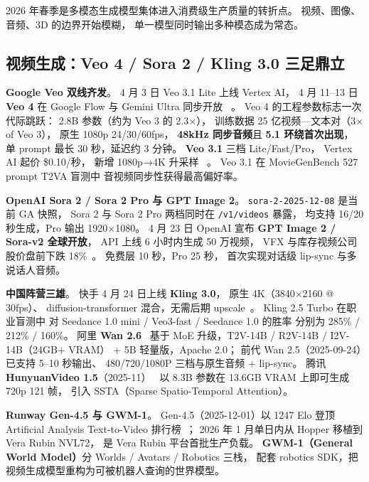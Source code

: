 2026 年春季是多模态生成模型集体进入消费级生产质量的转折点。
视频、图像、音频、3D 的边界开始模糊，
单一模型同时输出多种模态成为常态。

\subsection{视频生成：Veo 4 / Sora 2 / Kling 3.0 三足鼎立}

\textbf{Google Veo 双线齐发}。
4 月 3 日 Veo 3.1 Lite 上线 Vertex AI，
4 月 11--13 日 \textbf{Veo 4} 在 Google Flow 与 Gemini Ultra 同步开放%
~\cite{veo4_2026}。
Veo 4 的工程参数标志一次代际跳跃：
2.8B 参数（约为 Veo 3 的 2.3$\times$），
训练数据 25 亿视频—文本对（3$\times$ of Veo 3），
原生 1080p 24/30/60fps，
\textbf{48kHz 同步音频}且 \textbf{5.1 环绕首次出现}，
单 prompt 最长 30 秒，延迟约 3 分钟。
\textbf{Veo 3.1} 三档 Lite/Fast/Pro，
Vertex AI 起价 \$0.10/秒，
新增 1080p→4K 升采样%
~\cite{veo31_lite_2026}。
Veo 3.1 在 MovieGenBench 527 prompt T2VA 盲测中
音视频同步性获得最高偏好率。

\textbf{OpenAI Sora 2 / Sora 2 Pro 与 GPT Image 2}。
\texttt{sora-2-2025-12-08} 是当前 GA 快照，
Sora 2 与 Sora 2 Pro 两档同时在 \texttt{/v1/videos} 暴露，
均支持 16/20 秒生成，Pro 输出 1920$\times$1080。
4 月 23 日 OpenAI 宣布 \textbf{GPT Image 2 / Sora-v2 全球开放}，
API 上线 6 小时内生成 50 万视频，
VFX 与库存视频公司股价盘前下跌 18\%~\cite{sora2_pro_2026}。
免费层 10 秒，Pro 25 秒，
首次实现对话级 lip-sync 与多说话人音频。

\textbf{中国阵营三雄}。
快手 4 月 24 日上线 \textbf{Kling 3.0}，
原生 4K（3840$\times$2160 @ 30fps）、
diffusion-transformer 混合，无需后期 upscale~\cite{kling30_2026}。
Kling 2.5 Turbo 在职业盲测中
对 Seedance 1.0 mini / Veo3-fast / Seedance 1.0 的胜率
分别为 285\% / 212\% / 160\%。
阿里 \textbf{Wan 2.6}~\cite{wan26_2026}
基于 MoE 升级，T2V-14B / R2V-14B / I2V-14B（24GB+ VRAM）
+ 5B 轻量版，Apache 2.0；
前代 Wan 2.5（2025-09-24）已支持 5--10 秒输出、
480/720/1080P 三档与原生音频 + lip-sync。
腾讯 \textbf{HunyuanVideo 1.5}（2025-11）~\cite{hunyuan_video15_2025}
以 8.3B 参数在 13.6GB VRAM 上即可生成 720p 121 帧，
引入 SSTA（Sparse Spatio-Temporal Attention）。

\textbf{Runway Gen-4.5 与 GWM-1}。
Gen-4.5（2025-12-01）以 1247 Elo
登顶 Artificial Analysis Text-to-Video 排行榜~\cite{runway_gen45_2026}；
2026 年 1 月单日内从 Hopper 移植到 Vera Rubin NVL72，
是 Vera Rubin 平台首批生产负载。
\textbf{GWM-1（General World Model）}分 Worlds / Avatars / Robotics 三栈，
配套 robotics SDK，把视频生成模型重构为可被机器人查询的世界模型。

